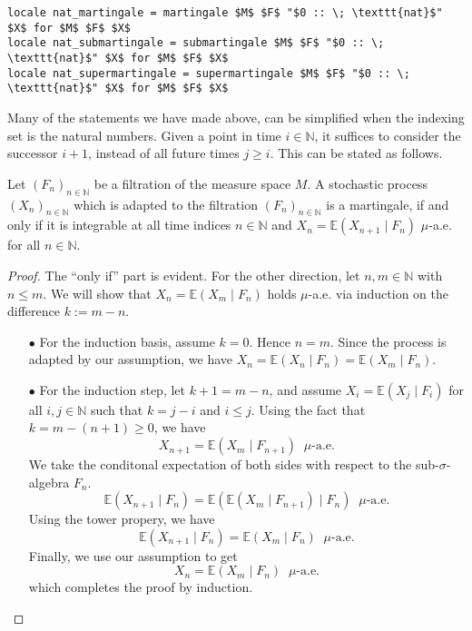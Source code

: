 \begin{isadefinition}
{\small
\begin{lstlisting}[style=isabelle]
locale nat_martingale = martingale $M$ $F$ "$0 :: \; \texttt{nat}$" $X$ for $M$ $F$ $X$
locale nat_submartingale = submartingale $M$ $F$ "$0 :: \; \texttt{nat}$" $X$ for $M$ $F$ $X$
locale nat_supermartingale = supermartingale $M$ $F$ "$0 :: \; \texttt{nat}$" $X$ for $M$ $F$ $X$
\end{lstlisting}
}
\end{isadefinition}

Many of the statements we have made above, can be simplified when the indexing set is the natural numbers. Given a point in time $i \in \mathbb{N}$, it suffices to consider the successor $i + 1$, instead of all future times $j \ge i$. This can be stated as follows.

\begin{lemma}
	Let $(F_n)_{n \in \mathbb{N}}$ be a filtration of the measure space $M$. A stochastic process $(X_n)_{n \in \mathbb{N}}$ which is adapted to the filtration $(F_n)_{n \in \mathbb{N}}$ is a martingale, if and only if it is integrable at all time indices $n \in \mathbb{N}$ and $X_n = \mathbb{E}(X_{n + 1} \;\vert\; F_n)$ $\mu$-a.e. for all $n \in \mathbb{N}$.
\end{lemma}
\begin{proof}
	The ``only if'' part is evident. For the other direction, let $n, m \in \mathbb{N}$ with $n \le m$. We will show that $X_n = \mathbb{E}(X_m \;\vert\; F_n)$ holds $\mu$-a.e. via induction on the difference $k := m - n$. 
	\begin{enumerate}
	\item[$\bullet$] For the induction basis, assume $k = 0$. Hence $n = m$. Since the process is adapted by our assumption, we have $X_n = \mathbb{E}(X_n \;\vert\; F_n) = \mathbb{E}(X_m \;\vert\; F_n)$.
	
	\item[$\bullet$] For the induction step, let $k + 1 = m - n$, and assume $X_i = \mathbb{E}(X_j \;\vert\; F_i)$ for all $i, j \in \mathbb{N}$ such that $k = j - i$ and $i \le j$. Using the fact that $k = m - (n + 1) \ge 0$, we have
	\[
		X_{n + 1} = \mathbb{E}(X_m \;\vert\; F_{n + 1}) \;\;\mu\textrm{-a.e.}
	\]
	We take the conditonal expectation of both sides with respect to the sub-$\sigma$-algebra $F_n$.
	\[
		\mathbb{E}(X_{n + 1} \;\vert\; F_n) =  \mathbb{E}(\mathbb{E}(X_m \;\vert\; F_{n + 1}) \;\vert\; F_n) \;\;\mu\textrm{-a.e.}
	\]
	Using the tower propery, we have
	\[
		\mathbb{E}(X_{n + 1} \;\vert\; F_n) =  \mathbb{E}(X_m \;\vert\; F_n) \;\;\mu\textrm{-a.e.}
	\]
	Finally, we use our assumption to get
	\[
		X_n =  \mathbb{E}(X_m \;\vert\; F_n) \;\;\mu\textrm{-a.e.}
	\]	
	which completes the proof by induction.
	\end{enumerate}
\end{proof}

